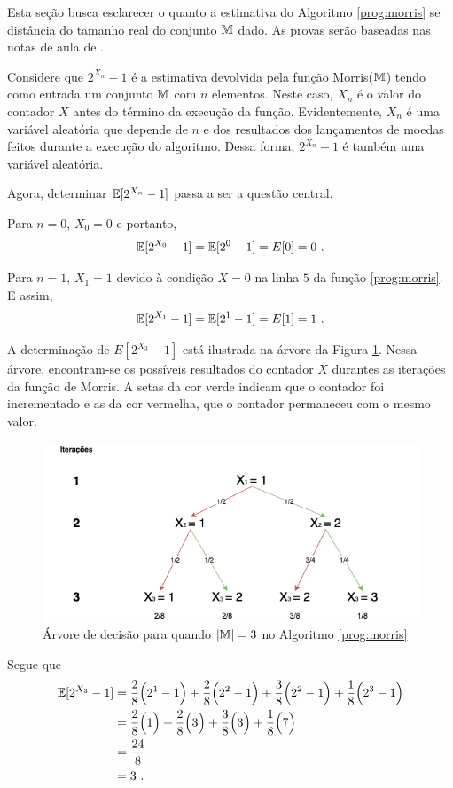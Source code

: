 Esta seção busca esclarecer o quanto a estimativa do Algoritmo \ref{prog:morris} se distância do tamanho real do conjunto $\mathbb{M}$ dado. As provas
serão baseadas nas notas de aula de \citep{LectureNotesAndoni}.

Considere que $2^{X_n} - 1$ é a estimativa devolvida pela função Morris($\mathbb{M}$) tendo como entrada um conjunto $\mathbb{M}$ com $n$ elementos.
Neste caso, $X_n$ é o valor do contador $X$ antes do término da execução da função.
Evidentemente, $X_n$ é uma variável aleatória que depende de $n$ e dos resultados dos lançamentos de moedas feitos durante a execução do algoritmo.
Dessa forma, $2^{X_n} - 1$ é também uma variável aleatória.

Agora, determinar $\mathbb{E}[2^{X_n} - 1]$ passa a ser a questão central.

Para $n = 0$, $X_0 = 0$ e portanto,
\[ \mathbb{E}[2^{X_0} - 1] = \mathbb{E}[2^0 - 1] = E[0] = 0 \ .\]

Para $n = 1$, $X_1 = 1$ devido à condição $X = 0$ na linha $5$ da função \ref{prog:morris}. E assim, 
\[ \Ebb[2^{X_1} - 1] = \Ebb[2^1 - 1] = E[1] = 1 \ .\]

A determinação de $E[2^{X_3} - 1]$ está ilustrada na árvore da Figura \ref{fig:morris-tree}.
Nessa árvore, encontram-se os possíveis resultados do contador $X$ durantes as iterações da função de Morris.
A setas da cor verde indicam que o contador foi incrementado e as da cor vermelha, que o contador permaneceu com o mesmo valor.

\begin{figure}
  \centering
  \includegraphics[scale=0.50]{figuras/morris-tree.png}
	\caption{Árvore de decisão para quando $|\mathbb{M}| = 3$ no Algoritmo \ref{prog:morris}}\label{fig:morris-tree}
\end{figure}

Segue que
\begin{align*}
  \mathbb{E}[2^{X_3} - 1] 
    &= \frac{2}{8} \Big(2^1 - 1\Big) + \frac{2}{8} \Big(2^2 - 1\Big) + \frac{3}{8}\Big(2^2 - 1\Big) + \frac{1}{8} \Big(2^3 - 1\Big) \\
    &= \frac{2}{8} \Big(1\Big) + \frac{2}{8} \Big(3\Big) + \frac{3}{8} \Big(3\Big) + \frac{1}{8} \Big(7\Big) \\
    &= \frac{24}{8} \\
    &= 3 \ .
\end{align*}


